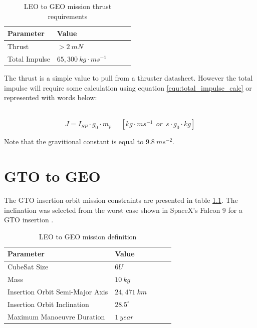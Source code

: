 \documentclass[a4paper, article, oneside, UKenglish]{memoir}
\newcommand{\0}{\mathbf{0}}
\newcommand{\1}{\mathbf{1}}
\begin{document}
\begin{table}[h]
\centering
\begin{tabular}{@{}lllll@{}}
\toprule
Parameter					& Value							\\ \midrule
Thrust						& $> 2~mN$						\\
Total Impulse				& $65,300~kg \cdot ms^{-1}$	\\ \bottomrule
\end{tabular}
\captionsetup{justification=centering}
\caption{LEO to GEO mission thrust requirements}
\label{tab:leo_to_geo_thruster_requirements}
\end{table}

The thrust is a simple value to pull from a thruster datasheet.  However the total impulse will require some calculation using equation \ref{equ:total_impulse_calc} or represented with words below:
\\
\\
\centerline{}

\begin{equation}
J = I_{SP} \cdot g_0 \cdot m_p ~~~~~~[kg \cdot ms^{-1}~~or~~ s \cdot g_0 \cdot kg]
\label{equ:total_impulse_calc}
\end{equation}

Note that the gravitional constant is equal to $ 9.8~ms^{-2} $.



\chapter{GTO to GEO}

The GTO insertion orbit mission constraints are presented in table \ref{tab:gto_to_geo_definition}.  The inclination was selected from the worst case shown in SpaceX's Falcon 9 for a GTO insertion \cite{falcon9}.

\begin{table}[h]
\centering
\begin{tabular}{@{}lllll@{}}
\toprule
Parameter						& Value			\\ \midrule
CubeSat Size					& $6U$			\\
Mass  							& $10~kg$		\\
Insertion Orbit Semi-Major Axis	& $24,471~km$	\\
Insertion Orbit Inclination		& $28.5^\circ$	\\
Maximum Manoeuvre Duration 		& $1~year$		\\ \bottomrule
\end{tabular}
\captionsetup{justification=centering}
\caption{LEO to GEO mission definition}
\label{tab:gto_to_geo_definition}
\end{table}
\end{document}
